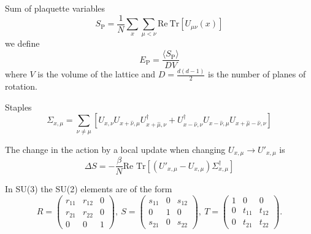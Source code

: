 \documentclass[12pt,a4paper]{article}
\begin{document}
Sum of plaquette variables
\begin{equation}
	\label{eq:Sp}
	S_{\text{P}} = \frac{1}{N} \sum_x\sum_{\mu < \nu} \text{Re}\ \text{Tr} [U_{\mu\nu}(x)]
\end{equation}
we define
\begin{equation}
	\label{eq:Ep}
	E_{\text{P}} =\frac{ \langle S_{\text{P}} \rangle}{D V}
\end{equation}
where $V$ is the volume of the lattice and $D = \frac{d(d-1)}{2}$ is the number of planes of rotation.

Staples
\begin{equation}
	\label{eq:staples}
	\Sigma_{x,\mu} = \sum_{\nu \neq \mu} \left[ U_{x,\nu}U_{x+\hat{\nu},\mu}U_{x+\hat{\mu},\nu}^{\dagger} + U_{x-\hat{\nu},\nu}^{\dagger}U_{x-\hat{\nu},\mu}U_{x+\hat{\mu}-\hat{\nu},\nu}\right]
\end{equation}

The change in the action  by a local update when changing $U_{x,\mu} \to U'_{x,\mu}$ is
\begin{equation}
	\label{eq:DS}
	\Delta S = -\frac{\beta}{N} \text{Re } \text{Tr} \left[ \left( U'_{x,\mu} - U_{x,\mu} \right)\Sigma_{x,\mu}^{\dagger}\right]
\end{equation}

In SU(3) the SU(2) elements are of the form
\begin{equation}
\label{eq:SU2_subgroups}
	R = \begin{pmatrix}
		r_{11} & r_{12} & 0 \\
		r_{21} & r_{22} & 0 \\
		0      & 0      & 1 
	\end{pmatrix},\ S = \begin{pmatrix}
		s_{11} & 0 & s_{12} \\
		0      & 1 & 0 \\
		s_{21} & 0 & s_{22} 
	\end{pmatrix},\ T = \begin{pmatrix}
		1 & 0 & 0 \\
		0 & t_{11} & t_{12} \\
		0 & t_{21} & t_{22}
	\end{pmatrix}.
\end{equation}
\end{document}
